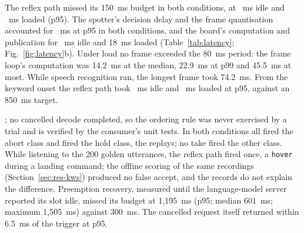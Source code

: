 \documentclass[a4paper,fleqn]{cas-dc}
\begin{document}
The reflex path missed its 150~ms budget in both conditions, at ~ms idle and ~ms loaded
(p95). The spotter's decision delay and the frame quantisation accounted for ~ms at p95 in both
conditions, and the board's computation and publication for ~ms idle and 18~ms loaded
(Table~\ref{tab:latency}; Fig.~\ref{fig:latency}b). 
Under load no frame exceeded the 80~ms period: the frame loop's computation was 14.2~ms at the
median, 22.9~ms at p99 and 45.5~ms at most. While speech recognition ran, the longest frame took 74.2~ms. From the keyword onset the reflex path took ~ms idle
and ~ms loaded at p95, against an 850~ms target.

; no cancelled decode completed, so the ordering rule was never exercised
by a trial and is verified by the consumer's unit tests. In both conditions all  fired
the abort class and  fired the hold class, the 
replays; no take fired the other class. While listening to the 200 golden utterances, the reflex path
fired once, a \texttt{hover} during a landing command; the offline scoring of the same recordings
(Section~\ref{sec:res-kws}) produced no false accept, and the records do not explain the difference.
Preemption recovery, measured until the language-model server reported its slot idle, missed its
budget at 1,195~ms (p95; median 601~ms; maximum 1,505~ms) against 300~ms. The cancelled request itself returned within 6.5~ms of the trigger at p95.
\end{document}
